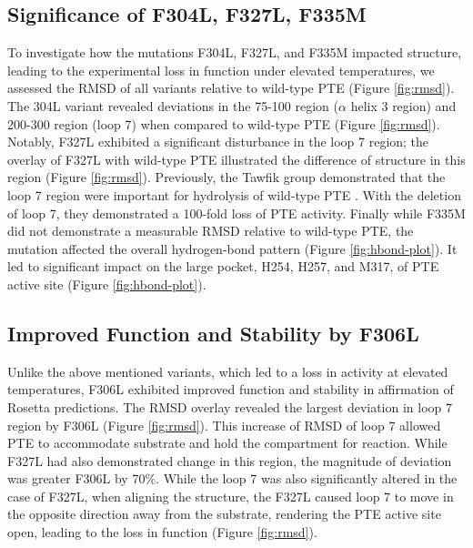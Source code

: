 \begin{refsection}
\subsection{Significance of F304L, F327L, F335M}

To investigate how the mutations F304L, F327L, and F335M impacted structure,
leading to the experimental loss in function under elevated temperatures, we
assessed the RMSD of all variants relative to wild-type PTE (Figure
\ref{fig:rmsd}). The 304L variant revealed deviations in the 75-100
region ($\alpha$ helix 3 region) and 200-300 region (loop 7) when compared to
wild-type PTE (Figure \ref{fig:rmsd}). Notably, F327L exhibited a significant
disturbance in the loop 7 region; the overlay of F327L with wild-type PTE
illustrated the difference of structure in this region (Figure \ref{fig:rmsd}).
Previously, the Tawfik group demonstrated that the loop 7 region were important
for hydrolysis of wild-type PTE \cite{Afriat-Jurnou2012}. With the deletion of
loop 7, they demonstrated a 100-fold loss of PTE activity. Finally while F335M
did not demonstrate a measurable RMSD relative to wild-type PTE, the mutation
affected the overall hydrogen-bond pattern (Figure \ref{fig:hbond-plot}). It
led to significant impact on the large pocket, H254, H257, and M317, of PTE
active site (Figure \ref{fig:hbond-plot}). 

\subsection{Improved Function and Stability by F306L}

Unlike the above mentioned variants, which led to a loss in activity at
elevated temperatures, F306L exhibited improved function and stability in
affirmation of Rosetta predictions. The RMSD overlay revealed the largest
deviation in loop 7 region by F306L  (Figure \ref{fig:rmsd}). This increase of
RMSD of loop 7 allowed PTE to accommodate substrate and hold the compartment
for reaction. While F327L had also demonstrated change in this region, the
magnitude of deviation was greater F306L by 70\%.  While the loop 7 was also
significantly altered in the case of F327L, when aligning the structure, the
F327L caused loop 7 to move in the opposite direction away from the substrate,
rendering the PTE active site open, leading to the loss in function (Figure
\ref{fig:rmsd}). 


\end{refsection}
